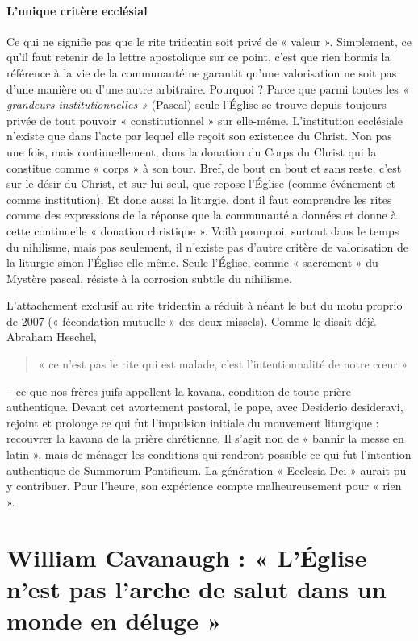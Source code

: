 \paragraph{L’unique critère ecclésial}

Ce qui ne signifie pas que le rite tridentin soit privé de « valeur ». Simplement, ce qu’il faut retenir de la lettre apostolique sur ce point, c’est que rien hormis la référence à la vie de la communauté ne garantit qu’une valorisation ne soit pas d’une manière ou d’une autre arbitraire. Pourquoi ? Parce que parmi toutes les \textit{« grandeurs institutionnelles »} (Pascal) seule l’Église se trouve depuis toujours privée de tout pouvoir « constitutionnel » sur elle-même. L’institution ecclésiale n’existe que dans l’acte par lequel elle reçoit son existence du Christ. Non pas une fois, mais continuellement, dans la donation du Corps du Christ qui la constitue comme « corps » à son tour. Bref, de bout en bout et sans reste, c’est sur le désir du Christ, et sur lui seul, que repose l’Église (comme événement et comme institution). Et donc aussi la liturgie, dont il faut comprendre les rites comme des expressions de la réponse que la communauté a données et donne à cette continuelle « donation christique ». Voilà pourquoi, surtout dans le temps du nihilisme, mais pas seulement, il n’existe pas d’autre critère de valorisation de la liturgie sinon l’Église elle-même. Seule l’Église, comme « sacrement » du Mystère pascal, résiste à la corrosion subtile du nihilisme.
 
L’attachement exclusif au rite tridentin a réduit à néant le but du motu proprio de 2007 (« fécondation mutuelle » des deux missels). Comme le disait déjà Abraham Heschel, 
\begin{quote}
    « ce n’est pas le rite qui est malade, c’est l’intentionnalité de notre cœur »
\end{quote}
 – ce que nos frères juifs appellent la kavana, condition de toute prière authentique. Devant cet avortement pastoral, le pape, avec Desiderio desideravi, rejoint et prolonge ce qui fut l’impulsion initiale du mouvement liturgique : recouvrer la kavana de la prière chrétienne. Il s’agit non de « bannir la messe en latin », mais de ménager les conditions qui rendront possible ce qui fut l’intention authentique de Summorum Pontificum. La génération « Ecclesia Dei » aurait pu y contribuer. Pour l’heure, son expérience compte malheureusement pour « rien ».
 
 
 
 \section{William Cavanaugh : « L’Église n’est pas l’arche de salut dans un monde en déluge » }

